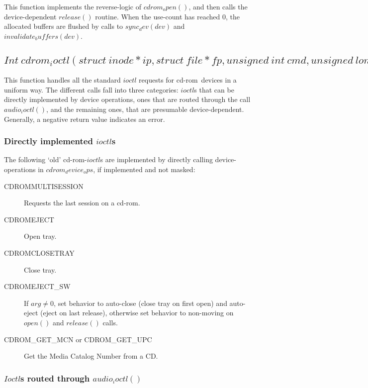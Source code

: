 \documentclass{article}
\def\cdrom{{\sc cd-rom}}
\begin{document}
This function implements the reverse-logic of $cdrom_open()$, and then
calls the device-dependent $release()$ routine. When the use-count has
reached 0, the allocated buffers are flushed by calls to $sync_dev(dev)$
and $invalidate_buffers(dev)$.


\subsection{$Int\ cdrom_ioctl(struct\ inode *ip, struct\ file *fp,
                       unsigned\ int\ cmd, unsigned\ long\ arg)$}
\label{cdrom-ioctl}

This function handles all the standard $ioctl$ requests for \cdrom\
devices in a uniform way. The different calls fall into three
categories: $ioctl$s that can be directly implemented by device
operations, ones that are routed through the call $audio_ioctl()$, and
the remaining ones, that are presumable device-dependent. Generally, a
negative return value indicates an error.

\subsubsection{Directly implemented $ioctl$s}
\label{ioctl-direct}

The following `old' \cdrom-$ioctl$s are implemented by directly
calling device-operations in $cdrom_device_ops$, if implemented and
not masked:
\begin{description}
\item[CDROMMULTISESSION] Requests the last session on a \cdrom.
\item[CDROMEJECT] Open tray. 
\item[CDROMCLOSETRAY] Close tray.
\item[CDROMEJECT_SW] If $arg\not=0$, set behavior to auto-close (close
tray on first open) and auto-eject (eject on last release), otherwise
set behavior to non-moving on $open()$ and $release()$ calls.
\item[CDROM_GET_MCN or CDROM_GET_UPC] Get the Media Catalog Number from a CD.
\end{description}

\subsubsection{$Ioctl$s routed through $audio_ioctl()$}
\label{ioctl-audio}
\end{document}
